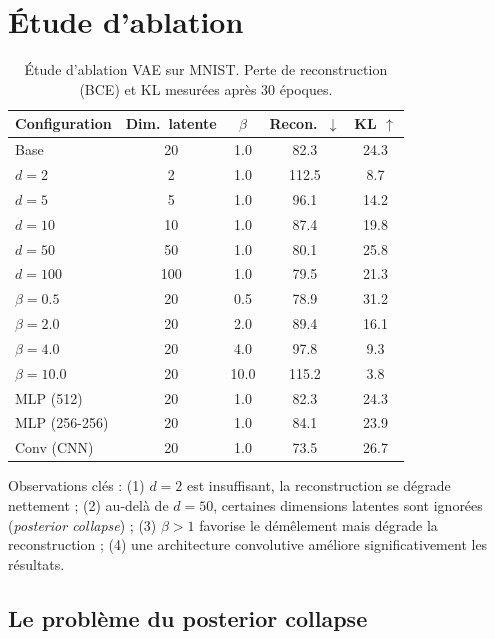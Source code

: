 \section{\'Etude d'ablation}
\label{sec:vae-ablation}

\begin{table}[htbp]
\centering
\caption{\'Etude d'ablation VAE sur MNIST. Perte de reconstruction (BCE) et KL mesur\'ees apr\`es 30 \'epoques.}
\label{tab:vae-ablation}
\begin{tabular}{lcccc}
\toprule
\textbf{Configuration} & \textbf{Dim.\ latente} & \textbf{$\beta$} & \textbf{Recon.\ $\downarrow$} & \textbf{KL $\uparrow$} \\
\midrule
Base & 20 & 1.0 & 82.3 & 24.3 \\
\midrule
$d=2$ & 2 & 1.0 & 112.5 & 8.7 \\
$d=5$ & 5 & 1.0 & 96.1 & 14.2 \\
$d=10$ & 10 & 1.0 & 87.4 & 19.8 \\
$d=50$ & 50 & 1.0 & 80.1 & 25.8 \\
$d=100$ & 100 & 1.0 & 79.5 & 21.3 \\
\midrule
$\beta = 0.5$ & 20 & 0.5 & 78.9 & 31.2 \\
$\beta = 2.0$ & 20 & 2.0 & 89.4 & 16.1 \\
$\beta = 4.0$ & 20 & 4.0 & 97.8 & 9.3 \\
$\beta = 10.0$ & 20 & 10.0 & 115.2 & 3.8 \\
\midrule
MLP (512) & 20 & 1.0 & 82.3 & 24.3 \\
MLP (256-256) & 20 & 1.0 & 84.1 & 23.9 \\
Conv (CNN) & 20 & 1.0 & 73.5 & 26.7 \\
\bottomrule
\end{tabular}
\end{table}

\begin{remarque}
Observations cl\'es : (1) $d=2$ est insuffisant, la reconstruction se d\'egrade nettement ; (2) au-del\`a de $d=50$, certaines dimensions latentes sont ignor\'ees (\emph{posterior collapse}) ; (3) $\beta > 1$ favorise le d\'em\^element mais d\'egrade la reconstruction ; (4) une architecture convolutive am\'eliore significativement les r\'esultats.
\end{remarque}

\subsection{Le probl\`eme du posterior collapse}

